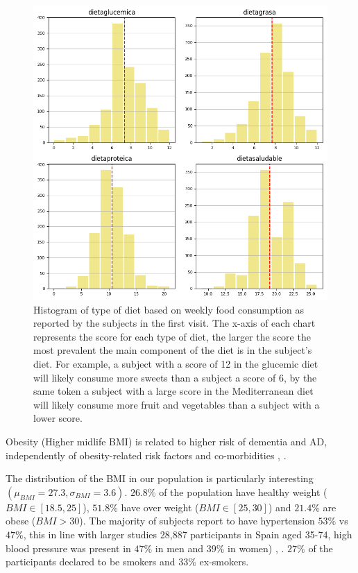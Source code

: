 \documentclass[11pt]{article}
\theoremstyle{definition}
\theoremstyle{remark}
\begin{document}
\begin{figure}[H]
        \centering
        \includegraphics[keepaspectratio, width=.8\linewidth]{figures/Fig_diet}
        \caption{Histogram of type of diet based on weekly food consumption as reported by the subjects in the first visit. The x-axis of each chart represents the score for each type of diet, the larger the score the most prevalent the main component of the diet is in the subject's diet. For example, a subject with a score of 12 in the glucemic diet will likely consume more sweets than a subject a score of 6, by the same token a subject with a large score in the Mediterranean diet will likely consume more fruit and vegetables than a subject with a lower score.} 
        \label{fig:diet}
\end{figure}

Obesity (Higher midlife BMI) is related to higher risk of dementia and AD, independently of obesity-related risk factors and co-morbidities \cite{tolppanen2014midlife}, \cite{nepal2014rising}. 

The distribution of the BMI in our population is particularly interesting $(\mu_{BMI}=27.3, \sigma_{BMI}=3.6)$. $26.8\%$ of the population have healthy weight ($BMI \in [18.5, 25]$), $51.8\%$ have over weight ($BMI \in [25,30]$) and $21.4\%$ are obese ($BMI > 30$). 
The majority of subjects report to have hypertension $53\%$ vs $47\%$, this in line with larger studies 28,887 participants in Spain aged 35-74, high blood pressure was present in $47\%$ in men and $39\%$ in women) \cite{grau2011cardiovascular}, \cite{lacruz2015prevalence}.
$27\%$ of the participants declared to be smokers and $33\%$ ex-smokers.
\end{document}
